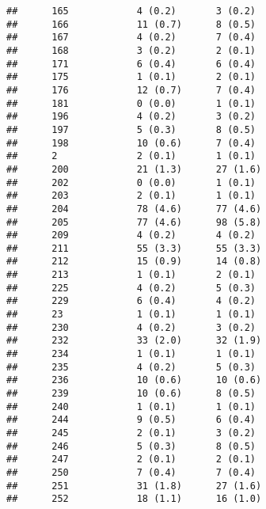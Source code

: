 \documentclass[]{article}
\begin{document}
\begin{verbatim}
##      165            4 (0.2)       3 (0.2)                        
##      166            11 (0.7)      8 (0.5)                        
##      167            4 (0.2)       7 (0.4)                        
##      168            3 (0.2)       2 (0.1)                        
##      171            6 (0.4)       6 (0.4)                        
##      175            1 (0.1)       2 (0.1)                        
##      176            12 (0.7)      7 (0.4)                        
##      181            0 (0.0)       1 (0.1)                        
##      196            4 (0.2)       3 (0.2)                        
##      197            5 (0.3)       8 (0.5)                        
##      198            10 (0.6)      7 (0.4)                        
##      2              2 (0.1)       1 (0.1)                        
##      200            21 (1.3)      27 (1.6)                       
##      202            0 (0.0)       1 (0.1)                        
##      203            2 (0.1)       1 (0.1)                        
##      204            78 (4.6)      77 (4.6)                       
##      205            77 (4.6)      98 (5.8)                       
##      209            4 (0.2)       4 (0.2)                        
##      211            55 (3.3)      55 (3.3)                       
##      212            15 (0.9)      14 (0.8)                       
##      213            1 (0.1)       2 (0.1)                        
##      225            4 (0.2)       5 (0.3)                        
##      229            6 (0.4)       4 (0.2)                        
##      23             1 (0.1)       1 (0.1)                        
##      230            4 (0.2)       3 (0.2)                        
##      232            33 (2.0)      32 (1.9)                       
##      234            1 (0.1)       1 (0.1)                        
##      235            4 (0.2)       5 (0.3)                        
##      236            10 (0.6)      10 (0.6)                       
##      239            10 (0.6)      8 (0.5)                        
##      240            1 (0.1)       1 (0.1)                        
##      244            9 (0.5)       6 (0.4)                        
##      245            2 (0.1)       3 (0.2)                        
##      246            5 (0.3)       8 (0.5)                        
##      247            2 (0.1)       2 (0.1)                        
##      250            7 (0.4)       7 (0.4)                        
##      251            31 (1.8)      27 (1.6)                       
##      252            18 (1.1)      16 (1.0)                       

\end{verbatim}
\end{document}
